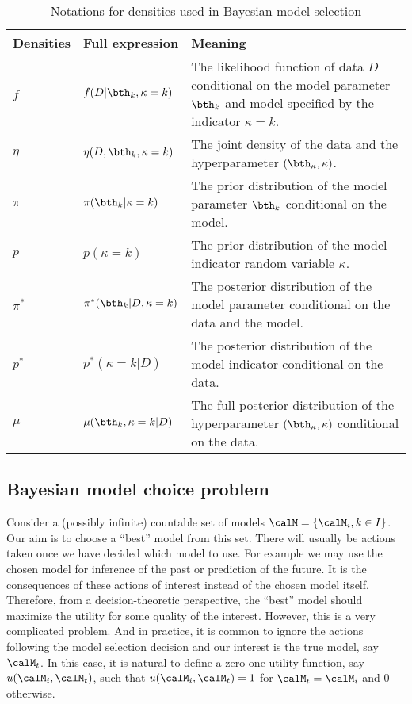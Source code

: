 \begin{table}[ht]
  \caption{Notations for densities used in Bayesian model selection}
  \label{tab:notations}
  \begin{tabularx}{\textwidth}{llX}
    \toprule
    Densities & Full expression & Meaning \\
    \midrule
    $f$ & $f(D|\bth_k,\kappa=k)$
    & The likelihood function of data $D$ conditional on the model parameter
    $\bth_k$ and model specified by the
    indicator $\kappa = k$. \\
    $\eta$ & $\eta(D,\bth_k,\kappa=k)$
    & The joint density of the data and the hyperparameter
    $(\bth_{\kappa},\kappa)$. \\
    $\pi$ & $\pi(\bth_k|\kappa=k)$
    & The prior distribution of the model parameter $\bth_k$ conditional on
    the model. \\
    $p$ & $p(\kappa = k)$
    & The prior distribution of the model indicator random variable
    $\kappa$. \\
    $\pi^*$ & $\pi^*(\bth_k|D,\kappa=k)$
    & The posterior distribution of the model parameter conditional on the
    data and the model. \\
    $p^*$ & $p^*(\kappa=k|D)$
    & The posterior distribution of the model indicator conditional on the
    data. \\
    $\mu$ & $\mu(\bth_k,\kappa=k|D)$
    & The full posterior distribution of the hyperparameter
    $(\bth_{\kappa},\kappa)$ conditional on the data. \\
    \bottomrule
  \end{tabularx}
\end{table}

\subsection{Bayesian model choice problem}
\label{sub:Bayesian model choice problem}

Consider a (possibly infinite) countable set of models $\calM = \{\calM_i,
  k\in I\}$. Our aim is to choose a ``best'' model from this set. There will
usually be actions taken once we have decided which model to use. For example
we may use the chosen model for inference of the past or prediction of the
future. It is the consequences of these actions of interest instead of the
chosen model itself. Therefore, from a decision-theoretic perspective, the
``best'' model should maximize the utility for some quality of the interest.
However, this is a very complicated problem. And in practice, it is common to
ignore the actions following the model selection decision and our interest is
the true model, say $\calM_t$. In this case, it is natural to define a
zero-one utility function, say $u(\calM_i,\calM_t)$, such that
$u(\calM_i,\calM_t) = 1$ for $\calM_t = \calM_i$ and $0$ otherwise.

